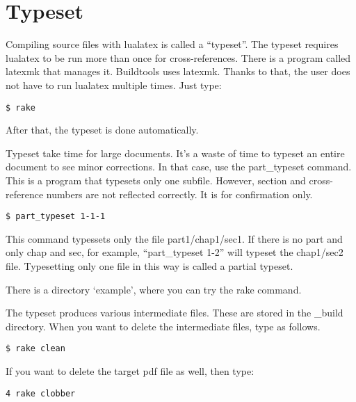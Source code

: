 
\section{Typeset}

Compiling source files with lualatex is called a ``typeset''. The
typeset requires lualatex to be run more than once for cross-references.
There is a program called latexmk that manages it. Buildtools uses
latexmk. Thanks to that, the user does not have to run lualatex multiple
times. Just type:

\begin{verbatim}
$ rake
\end{verbatim}

After that, the typeset is done automatically.

Typeset take time for large documents. It's a waste of time to typeset
an entire document to see minor corrections. In that case, use the
part\_typeset command. This is a program that typesets only one subfile.
However, section and cross-reference numbers are not reflected
correctly. It is for confirmation only.

\begin{verbatim}
$ part_typeset 1-1-1
\end{verbatim}

This command typessets only the file part1/chap1/sec1. If there is no
part and only chap and sec, for example, ``part\_typeset 1-2'' will
typeset the chap1/sec2 file. Typesetting only one file in this way is
called a partial typeset.

There is a directory `example', where you can try the rake command.

The typeset produces various intermediate files. These are stored in the
\_build directory. When you want to delete the intermediate files, type
as follows.

\begin{verbatim}
$ rake clean
\end{verbatim}

If you want to delete the target pdf file as well, then type:

\begin{verbatim}
4 rake clobber
\end{verbatim}
